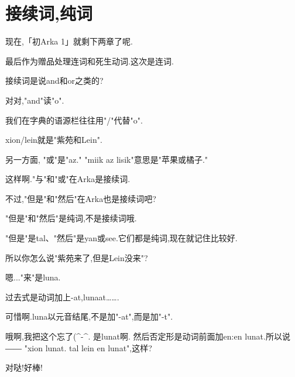 \chapter{接续词,纯词}
现在,「初Arka 1」就剩下两章了呢.

最后作为赠品处理连词和死生动词.这次是连词.


接续词是说and和or之类的?


对对,"and"读"o".

我们在字典的语源栏往往用"/"代替"o".

xion/lein就是"紫苑和Lein".


另一方面, "或"是"az."
"miik az lisik"意思是"苹果或橘子."


这样啊."与"和"或"在Arka是接续词.

不过,"但是"和"然后"在Arka也是接续词吧?


"但是"和"然后"是纯词,不是接续词哦.

"但是"是tal、"然后"是yan或see.它们都是纯词,现在就记住比较好.

所以你怎么说"紫苑来了,但是Lein没来"?


嗯..."来"是luna.

过去式是动词加上-at,lunaat…….


可惜啊.luna以元音结尾,不是加"-at",而是加"-t".


哦啊,我把这个忘了(\^{}-\^{}. 是lunat啊.
然后否定形是动词前面加en:en lunat.所以说――
"xion lunat. tal lein en lunat",这样?


对哒!好棒!